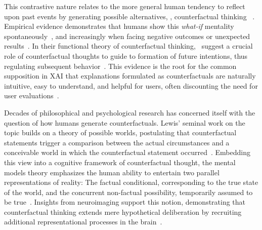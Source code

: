 This contrastive nature relates to the more general human tendency to reflect upon past events by generating possible alternatives, \ie, counterfactual thinking ~\citep{roese_counterfactual_1997}.
Empirical evidence demonstrates that humans show this \textit{what-if} mentality spontaneously~\citep{goldinger_blaming_2003}, and increasingly when facing negative outcomes or unexpected results~\citep{sanna_antecedents_1996}.
In their functional theory of counterfactual thinking,~\citeauthor{roese_functional_2017} suggest a crucial role of counterfactual thoughts to guide to formation of future intentions, thus regulating subsequent behavior~\citep{roese_functional_2017,epstude_functional_2008}.
This evidence is the root for the common supposition in \gls{XAI} that explanations formulated as counterfactuals are naturally intuitive, easy to understand, and helpful for users, often discounting the need for user evaluations~\citep{stepin_paving_2019, dandl_multi-objective_2020, guidotti_local_2018, artelt_efficient_2022}.

Decades of philosophical and psychological research has concerned itself with the question of how humans generate counterfactuals. 
Lewis' seminal work on the topic builds on a theory of possible worlds, postulating that counterfactual statements trigger a comparison between the actual circumstances and a conceivable world in which the counterfactual statement occurred~\citep{lewis_counterfactuals_1973}.
Embedding this view into a cognitive framework of counterfactual thought, the mental models theory emphasizes the human ability to entertain two parallel representations of reality: The factual conditional, corresponding to the true state of the world, and the concurrent non-factual possibility, temporarily assumed to be true~\citep{byrne_mental_2002,byrne_precis_2007,johnson-laird_conditionals_2002,walsh_mental_2005}.
Insights from neuroimaging support this notion, demonstrating that counterfactual thinking extends mere hypothetical deliberation by recruiting additional representational processes in the brain~\citep{kulakova_processing_2013}.

